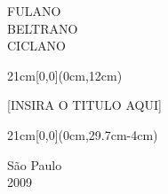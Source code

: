 \begin{center}
  {\large FULANO \\
    BELTRANO \\
    CICLANO}
\end{center}

\begin{textblock*}{21cm}[0,0](0cm,12cm)
  \begin{center}
    {\LARGE [INSIRA O TITULO AQUI] }
  \end{center}
\end{textblock*}


\begin{textblock*}{21cm}[0,0](0cm,29.7cm-4cm)
  \begin{center}
    {\large São Paulo \\ 2009 }
  \end{center}
\end{textblock*}


